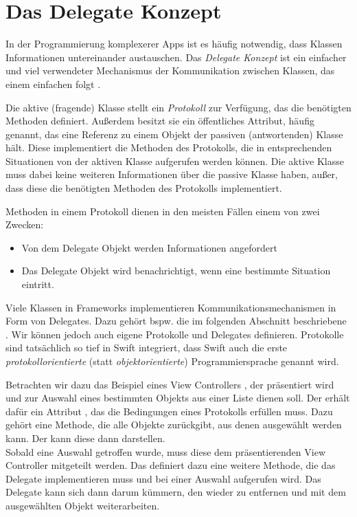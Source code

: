 \documentclass[parskip=half, final]{scrreprt}
\begin{document}
\section{Das Delegate Konzept}\label{sec:delegate_konzept}

In der Programmierung komplexerer Apps ist es häufig notwendig, dass Klassen Informationen untereinander austauschen. Das \emph{Delegate Konzept} ist ein einfacher und viel verwendeter Mechanismus der  Kommunikation zwischen Klassen, das einem einfachen  folgt .


Die aktive (fragende) Klasse stellt ein \emph{Protokoll} zur Verfügung, das die benötigten Methoden definiert. Außerdem besitzt sie ein öffentliches Attribut, häufig  genannt, das eine Referenz zu einem Objekt der passiven (antwortenden) Klasse hält. Diese implementiert die Methoden des Protokolls, die in entsprechenden Situationen von der aktiven Klasse aufgerufen werden können. Die aktive Klasse muss dabei keine weiteren Informationen über die passive Klasse haben, außer, dass diese die benötigten Methoden des Protokolls implementiert.

Methoden in einem Protokoll dienen in den meisten Fällen einem von zwei Zwecken:
\begin{itemize}
	\item Von dem Delegate Objekt werden Informationen angefordert
	\item Das Delegate Objekt wird benachrichtigt, wenn eine bestimmte Situation eintritt.
\end{itemize}

Viele Klassen in Frameworks implementieren Kommunikationsmechanismen in Form von Delegates. Dazu gehört bspw. die im folgenden Abschnitt beschriebene . Wir können jedoch auch eigene Protokolle und Delegates definieren. Protokolle sind tatsächlich so tief in Swift integriert, dass Swift auch die erste \emph{protokollorientierte} (statt \emph{objektorientierte}) Programmiersprache genannt wird.

Betrachten wir dazu das Beispiel eines View Controllers , der präsentiert wird und zur Auswahl eines bestimmten Objekts aus einer Liste dienen soll. Der  erhält dafür ein Attribut , das die Bedingungen eines  Protokolls erfüllen muss. Dazu gehört eine Methode, die alle Objekte zurückgibt, aus denen ausgewählt werden kann. Der  kann diese dann darstellen.\\
Sobald eine Auswahl getroffen wurde, muss diese dem präsentierenden View Controller mitgeteilt werden. Das  definiert dazu eine weitere Methode, die das Delegate implementieren muss und bei einer Auswahl aufgerufen wird. Das Delegate kann sich dann darum kümmern, den  wieder zu entfernen und mit dem ausgewählten Objekt weiterarbeiten.
\end{document}

